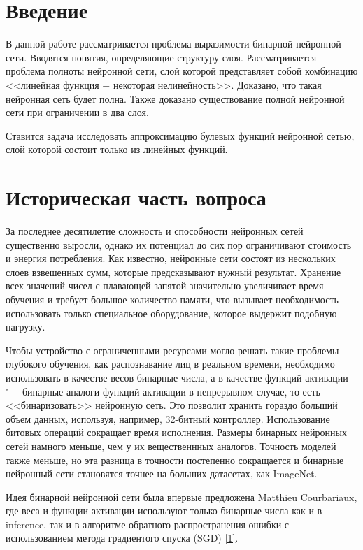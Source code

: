 \documentclass[a4paper, 14pt]{extarticle}
\begin{document}
\section{Введение}
    В данной работе рассматривается проблема выразимости бинарной нейронной сети. Вводятся понятия, определяющие структуру слоя. Рассматривается проблема полноты нейронной сети, слой которой представляет собой комбинацию <<линейная функция + некоторая нелинейность>>. Доказано, что такая нейронная сеть будет полна. Также доказано существование полной нейронной сети при ограничении в два слоя.
    
    Ставится задача исследовать аппроксимацию булевых функций нейронной сетью, слой которой состоит только из линейных функций.
\newpage


\section{Историческая часть вопроса}
    За последнее десятилетие сложность и способности нейронных сетей существенно выросли, однако их потенциал до сих пор ограничивают стоимость и энергия потребления. Как известно, нейронные сети состоят из нескольких слоев взвешенных сумм, которые предсказывают нужный результат. Хранение всех значений чисел с плавающей запятой значительно увеличивает время обучения и требует большое количество памяти, что вызывает необходимость использовать только специальное оборудование, которое выдержит подобную нагрузку.
    
    Чтобы устройство с ограниченными ресурсами могло решать такие проблемы глубокого обучения, как распознавание лиц в реальном времени, необходимо использовать в качестве весов бинарные числа, а в качестве функций активации "--- бинарные аналоги функций активации в непрерывном случае, то есть <<бинаризовать>> нейронную сеть. Это позволит хранить гораздо больший объем данных, используя, например, 32-битный контроллер. Использование битовых операций сокращает время исполнения. Размеры бинарных нейронных сетей намного меньше, чем у их вещественнных аналогов. Точность моделей также меньше, но эта разница в точности постепенно сокращается и бинарные нейронный сети становятся точнее на больших датасетах, как ImageNet.
    
    Идея бинарной нейронной сети была впервые предложена Matthieu Courbariaux, где веса и функции активации используют только бинарные числа как и в inference, так и в алгоритме обратного распространения ошибки с использованием метода градиентого спуска (SGD) \hyperlink{p1}{[1]}.
    
\end{document}
